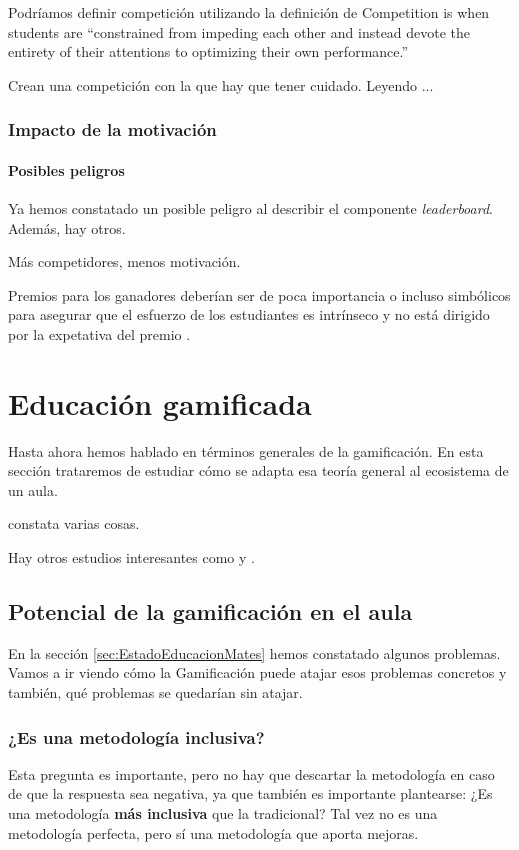 Podríamos definir competición utilizando la definición de \cite{Crawford_CompetitionDef} Competition is when students are “constrained from impeding each other and instead devote the entirety of their attentions to optimizing their own performance.”

Crean una competición con la que hay que tener cuidado. Leyendo \cite{CompetitionInEd}...

\subsubsection{Impacto de la motivación}

\paragraph{Posibles peligros}
\label{PosiblesPeligros}

Ya hemos constatado un posible peligro al describir el componente \textit{leaderboard}. Además, hay otros.

Más competidores, menos motivación. \cite{n-effect}

Premios para los ganadores deberían ser de poca importancia o incluso simbólicos para asegurar que el esfuerzo de los estudiantes es intrínseco y no está dirigido por la expetativa del premio \cite{CompetitionInEd}.

\section{Educación gamificada}

Hasta ahora hemos hablado en términos generales de la gamificación. 
%
En esta sección trataremos de estudiar cómo se adapta esa teoría general al ecosistema de un aula.

\cite{lee2011gamification} constata varias cosas.

Hay otros estudios interesantes como \cite{Hanus2015152} y \cite{ReviewGamificationInEducation}.

\subsection{Potencial de la gamificación en el aula}

En la sección \ref{sec:EstadoEducacionMates} hemos constatado algunos problemas. 
%
Vamos a ir viendo cómo la Gamificación puede atajar esos problemas concretos y también, qué problemas se quedarían sin atajar.

\subsubsection{¿Es una metodología inclusiva?}

Esta pregunta es importante, pero no hay que descartar la metodología en caso de que la respuesta sea negativa, ya que también es importante plantearse:  ¿Es una metodología \textbf{más inclusiva} que la tradicional?
%
Tal vez no es una metodología perfecta, pero sí una metodología que aporta mejoras.

